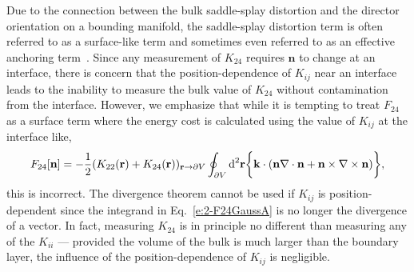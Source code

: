 Due to the connection between the bulk saddle-splay distortion and the director orientation on a bounding manifold, the saddle-splay distortion term is often referred to as a surface-like term and sometimes even referred to as an effective anchoring term~\cite{RN206,RN33,RN194,RN58,RN57,RN151}.
Since any measurement of $K_{24}$ requires $\mathbf{n}$ to change at an interface, there is concern that the position-dependence of $K_{ij}$ near an interface leads to the inability to measure the bulk value of $K_{24}$ without contamination from the interface.
However, we emphasize that while it is tempting to treat $F_{24}$ as a surface term where the energy cost is calculated using the value of $K_{ij}$ at the interface like,
\begin{equation}
  F_{24}[\mathbf{n}] = - \frac{1}{2}(K_{22}(\mathbf{r}) + K_{24}(\mathbf{r}))_{\mathbf{r} \rightarrow \partial V} \oint_{\partial V} \textup{d}^2  \mathbf{r} \bigg \{   \mathbf{k} \cdot (\mathbf{n}\nabla \cdot \mathbf{n} + \mathbf{n} \times \nabla \times \mathbf{n}) \bigg \},
\end{equation}
this is incorrect.
The divergence theorem cannot be used if $K_{ij}$ is position-dependent since the integrand in Eq.~\ref{e:2-F24GaussA} is no longer the divergence of a vector.
In fact, measuring $K_{24}$ is in principle no different than measuring any of the $K_{ii}$ --- provided the volume of the bulk is much larger than the boundary layer, the influence of the position-dependence of $K_{ij}$ is negligible.

